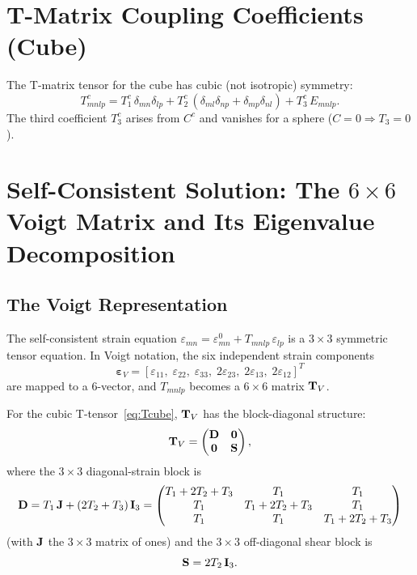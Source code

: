 \section{T-Matrix Coupling Coefficients (Cube)}

The T-matrix tensor for the cube has cubic (not isotropic) symmetry:
\begin{equation}
  T_{mnlp}^c = T_1^c\,\delta_{mn}\delta_{lp}
  + T_2^c\,(\delta_{ml}\delta_{np} + \delta_{mp}\delta_{nl})
  + T_3^c\,E_{mnlp}.
\label{eq:Tcube}
\end{equation}
The third coefficient $T_3^c$ arises from $C^c$ and vanishes for a sphere
($C=0 \Rightarrow T_3=0$).


\section{Self-Consistent Solution: The $6\times 6$ Voigt Matrix
  and Its Eigenvalue Decomposition}

\subsection{The Voigt Representation}

The self-consistent strain equation $\varepsilon_{mn} = \varepsilon_{mn}^0
+ T_{mnlp}\,\varepsilon_{lp}$ is a $3\times 3$ symmetric tensor equation.
In Voigt notation, the six independent strain components
\begin{equation}
  \boldsymbol{\varepsilon}_V
  = [\varepsilon_{11},\;\varepsilon_{22},\;\varepsilon_{33},\;
     2\varepsilon_{23},\;2\varepsilon_{13},\;2\varepsilon_{12}]^T
\label{eq:Voigt}
\end{equation}
are mapped to a 6-vector, and $T_{mnlp}$ becomes a $6\times 6$ matrix
$\mathbf{T}_V$.

For the cubic T-tensor~\eqref{eq:Tcube}, $\mathbf{T}_V$ has the block-diagonal
structure:
\begin{equation}
  \mathbf{T}_V = \begin{pmatrix} \mathbf{D} & \mathbf{0} \\ \mathbf{0} & \mathbf{S} \end{pmatrix},
\label{eq:TVblock}
\end{equation}
where the $3\times 3$ diagonal-strain block is
\begin{equation}
  \mathbf{D} = T_1\,\mathbf{J} + (2T_2 + T_3)\,\mathbf{I}_3
  = \begin{pmatrix}
    T_1+2T_2+T_3 & T_1 & T_1 \\
    T_1 & T_1+2T_2+T_3 & T_1 \\
    T_1 & T_1 & T_1+2T_2+T_3
  \end{pmatrix}
\label{eq:Dblock}
\end{equation}
(with $\mathbf{J}$ the $3\times 3$ matrix of ones) and the $3\times 3$
off-diagonal shear block is
\begin{equation}
  \mathbf{S} = 2T_2\,\mathbf{I}_3.
\label{eq:Sblock}
\end{equation}

